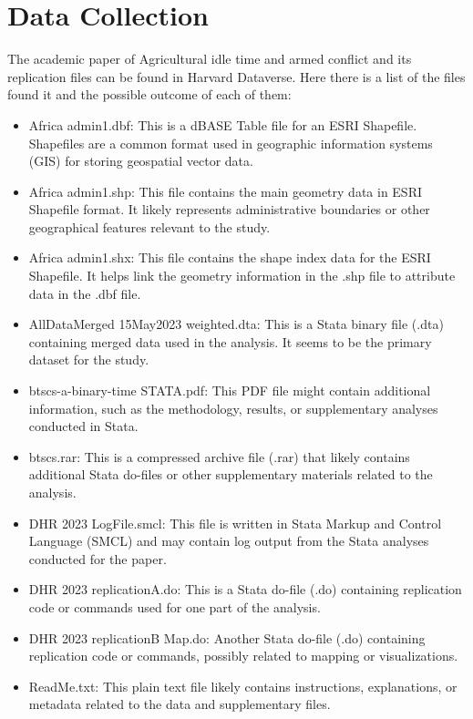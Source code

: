 \documentclass[12pt,letterpaper]{article}
\begin{document}
\section*{Data Collection}
The academic paper of Agricultural idle time and armed conflict and its replication files can be found in Harvard Dataverse.
Here there is a list of the files found it and the possible outcome of each of them:
\vspace{.25cm}
\begin{itemize}
\item Africa admin1.dbf: This is a dBASE Table file for an ESRI Shapefile. Shapefiles are a common format used in geographic information systems (GIS) for storing geospatial vector data.
\item Africa admin1.shp: This file contains the main geometry data in ESRI Shapefile format. It likely represents administrative boundaries or other geographical features relevant to the study.
\item Africa admin1.shx: This file contains the shape index data for the ESRI Shapefile. It helps link the geometry information in the .shp file to attribute data in the .dbf file.
\item AllDataMerged 15May2023 weighted.dta: This is a Stata binary file (.dta) containing merged data used in the analysis. It seems to be the primary dataset for the study.
\item btscs-a-binary-time STATA.pdf: This PDF file might contain additional information, such as the methodology, results, or supplementary analyses conducted in Stata.
\item btscs.rar: This is a compressed archive file (.rar) that likely contains additional Stata do-files or other supplementary materials related to the analysis.
\item DHR 2023 LogFile.smcl: This file is written in Stata Markup and Control Language (SMCL) and may contain log output from the Stata analyses conducted for the paper.
\item DHR 2023 replicationA.do: This is a Stata do-file (.do) containing replication code or commands used for one part of the analysis.
\item DHR 2023 replicationB Map.do: Another Stata do-file (.do) containing replication code or commands, possibly related to mapping or visualizations.
\item ReadMe.txt: This plain text file likely contains instructions, explanations, or metadata related to the data and supplementary files.
\end{itemize}
\end{document}
